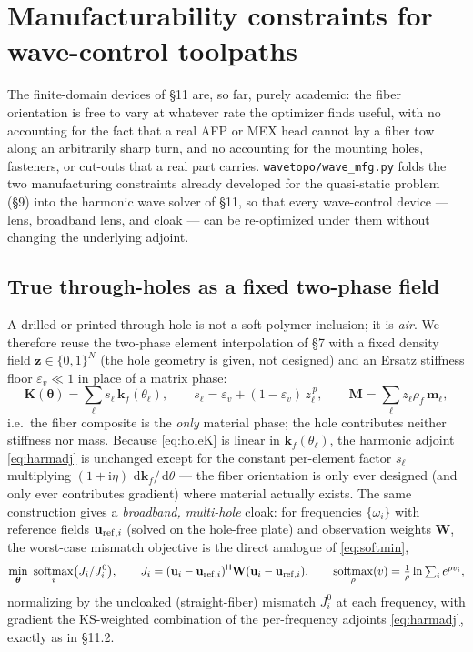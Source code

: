 \documentclass[11pt]{article}
\newcommand{\vth}{\bm{\theta}}
\newcommand{\vz}{\mathbf{z}}
\newcommand{\vu}{\mathbf{u}}
\newcommand{\vK}{\mathbf{K}}
\newcommand{\vM}{\mathbf{M}}
\newcommand{\vW}{\mathbf{W}}
\newcommand{\rmd}{\,\mathrm{d}}
\newcommand{\ii}{\mathrm{i}}
\newcommand{\HH}{^{\mathsf{H}}}
\DeclareMathOperator{\softmax}{softmax}
\begin{document}
\section{Manufacturability constraints for wave-control toolpaths}
\label{sec:wavemfg}
The finite-domain devices of \S11 are, so far, purely academic: the fiber
orientation is free to vary at whatever rate the optimizer finds useful, with
no accounting for the fact that a real AFP or MEX head cannot lay a fiber tow
along an arbitrarily sharp turn, and no accounting for the mounting holes,
fasteners, or cut-outs that a real part carries. \texttt{wavetopo/wave\_mfg.py}
folds the two manufacturing constraints already developed for the
quasi-static problem (\S9) into the harmonic wave solver of \S11, so that
every wave-control device --- lens, broadband lens, and cloak --- can be
re-optimized under them without changing the underlying adjoint.

\subsection{True through-holes as a fixed two-phase field}
A drilled or printed-through hole is not a soft polymer inclusion; it is
\emph{air}. We therefore reuse the two-phase element interpolation of \S7 with
a fixed density field $\vz\in\{0,1\}^N$ (the hole geometry is given, not
designed) and an Ersatz stiffness floor $\varepsilon_v\ll1$ in place of a
matrix phase:
\begin{equation}
  \vK(\vth)=\sum_\ell s_\ell\,\mathbf{k}_f(\theta_\ell),\qquad
  s_\ell=\varepsilon_v+(1-\varepsilon_v)\,z_\ell^{\,p},\qquad
  \vM=\sum_\ell z_\ell\rho_f\,\mathbf{m}_\ell,
  \label{eq:holeK}
\end{equation}
i.e.\ the fiber composite is the \emph{only} material phase; the hole
contributes neither stiffness nor mass. Because \eqref{eq:holeK} is linear in
$\mathbf{k}_f(\theta_\ell)$, the harmonic adjoint \eqref{eq:harmadj} is
unchanged except for the constant per-element factor $s_\ell$ multiplying
$(1+\ii\eta)\,\rmd\mathbf{k}_f/\rmd\theta$ --- the fiber orientation is only
ever designed (and only ever contributes gradient) where material actually
exists. The same construction gives a \emph{broadband, multi-hole} cloak: for
frequencies $\{\omega_i\}$ with reference fields $\vu_{{\rm ref},i}$ (solved
on the hole-free plate) and observation weights $\vW$, the worst-case
mismatch objective is the direct analogue of \eqref{eq:softmin},
\begin{equation}
  \min_{\vth}\ \softmax_i\bigl(J_i/J_i^0\bigr),\qquad
  J_i=(\vu_i-\vu_{{\rm ref},i})\HH\vW(\vu_i-\vu_{{\rm ref},i}),\qquad
  \softmax_\rho(v)=\tfrac1\rho\ln\textstyle\sum_ie^{\rho v_i},
  \label{eq:softmax_cloak}
\end{equation}
normalizing by the uncloaked (straight-fiber) mismatch $J_i^0$ at each
frequency, with gradient the KS-weighted combination of the per-frequency
adjoints \eqref{eq:harmadj}, exactly as in \S11.2.
\end{document}

